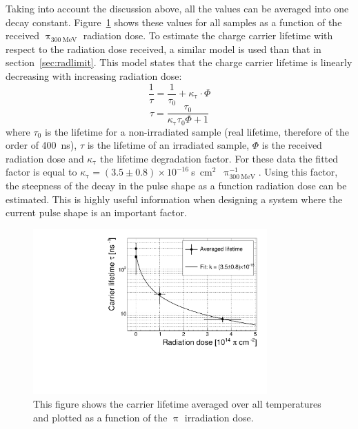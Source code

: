 Taking into account the discussion above, all the values can be averaged into one decay constant. Figure~\ref{fig:lifetimevsdose} shows these values for all samples as a function of the received $\uppi_\mathrm{300~MeV}$ radiation dose. To estimate the charge carrier lifetime with respect to the radiation dose received, a similar model is used than that in section~\ref{sec:radlimit}. This model states that the charge carrier lifetime is linearly decreasing with increasing radiation dose:
\begin{equation}
\label{eq:ltfactor}
\frac{1}{\tau} = \frac{1}{\tau_\mathrm{0}}+\kappa_{\mathrm{\tau}}\cdot\Phi
\end{equation} 
\begin{equation}
\label{eq:ltfactor1}
\tau = \frac{\tau_\mathrm{0}}{\kappa_{\mathrm{\tau}} \tau_\mathrm{0} \Phi + 1}
\end{equation} 
where $\tau_\mathrm{0}$ is the lifetime for a non-irradiated sample (real lifetime, therefore of the order of 400~ns), $\tau$ is the lifetime of an irradiated sample, $\Phi$ is the received radiation dose and $\kappa_{\mathrm{\tau}}$ the lifetime degradation factor. For these data the fitted factor is equal to $\kappa_{\mathrm{\tau}}=(3.5\pm0.8)\times10^{-16}~$s~cm$^2$~$\uppi_{\mathrm{300~MeV}}^{-1}$. Using this factor, the steepness of the decay in the pulse shape as a function radiation dose can be estimated. This is highly useful information when designing a system where the current pulse shape is an important factor.


\begin{figure}[!t]
\centering
\includegraphics[width=0.8\textwidth]{03_measurement_results/scripts/plots/taunew/avglifetime} 
\caption{This figure shows the carrier lifetime averaged over all temperatures and plotted as a function of the $\uppi$ irradiation dose.}
\label{fig:lifetimevsdose}
\end{figure}








